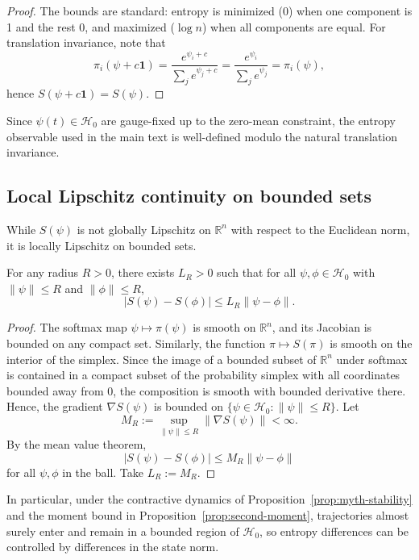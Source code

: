 \documentclass[11pt]{article}
\begin{document}
\begin{proof}
The bounds are standard: entropy is minimized (0) when one component is 1
and the rest 0, and maximized (\(\log n\)) when all components are equal.
For translation invariance, note that
\[
\pi_i(\psi + c\mathbf{1}) = \frac{e^{\psi_i + c}}{\sum_j e^{\psi_j + c}}
                          = \frac{e^{\psi_i}}{\sum_j e^{\psi_j}}
                          = \pi_i(\psi),
\]
hence \(S(\psi + c\mathbf{1}) = S(\psi)\).
\end{proof}

Since \(\psi(t)\in\mathcal{H}_0\) are gauge-fixed up to the zero-mean
constraint, the entropy observable used in the main text is well-defined
modulo the natural translation invariance.

\subsection{Local Lipschitz continuity on bounded sets}

While \(S(\psi)\) is not globally Lipschitz on \(\mathbb{R}^n\) with
respect to the Euclidean norm, it is locally Lipschitz on bounded sets.

\begin{proposition}
\label{prop:entropy-lipschitz}
For any radius \(R>0\), there exists \(L_R>0\) such that for all
\(\psi,\phi\in\mathcal{H}_0\) with \(\|\psi\|\le R\) and \(\|\phi\|\le R\),
\[
|S(\psi) - S(\phi)| \le L_R \|\psi - \phi\|.
\]
\end{proposition}

\begin{proof}
The softmax map \(\psi\mapsto \pi(\psi)\) is smooth on \(\mathbb{R}^n\), and
its Jacobian is bounded on any compact set. Similarly, the function
\(\pi\mapsto S(\pi)\) is smooth on the interior of the simplex. Since the
image of a bounded subset of \(\mathbb{R}^n\) under softmax is contained in
a compact subset of the probability simplex with all coordinates bounded
away from 0, the composition is smooth with bounded derivative there.
Hence, the gradient \(\nabla S(\psi)\) is bounded on
\(\{\psi \in \mathcal{H}_0 : \|\psi\|\le R\}\). Let
\[
M_R := \sup_{\|\psi\|\le R} \|\nabla S(\psi)\| < \infty.
\]
By the mean value theorem,
\[
|S(\psi) - S(\phi)| \le M_R \|\psi - \phi\|
\]
for all \(\psi,\phi\) in the ball. Take \(L_R := M_R\).
\end{proof}

In particular, under the contractive dynamics of
Proposition~\ref{prop:myth-stability} and the moment bound
in Proposition~\ref{prop:second-moment}, trajectories almost surely
enter and remain in a bounded region of \(\mathcal{H}_0\), so entropy
differences can be controlled by differences in the state norm.
\end{document}
